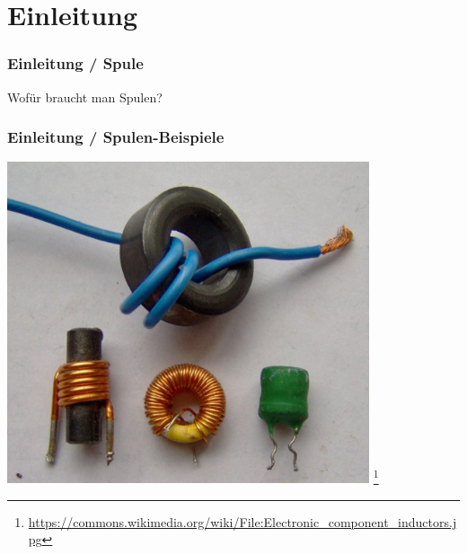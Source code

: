 

\subtitle{Technik Klasse E 06: \\
          Spule und Transformator \\[2em]}
\date{Stand 11.11.2014}



\section*{Einleitung}

\begin{frame}
    \frametitle{Einleitung / Spule}
    \begin{center}
        \Large{Wofür braucht man Spulen?} \\
    \end{center}
\end{frame}


\begin{frame}
    \frametitle{Einleitung / Spulen-Beispiele}

    \begin{center}
        \includegraphics[width=0.8\textwidth]{e06/Spule.jpg}
        \footnote{\tiny \url{https://commons.wikimedia.org/wiki/File:Electronic_component_inductors.jpg}}
    \end{center}
 	
\end{frame}

